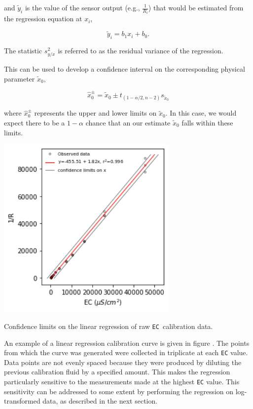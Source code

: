 and $\tilde{y}_i$ is the value of the sensor output (e.g., $\frac{1}{R_i}$) that would be estimated from the regression equation at $x_i$,

\begin{equation}\label{eq:linear}
	\tilde{y}_i=b_1 x_i +b_0.  
\end{equation}

The statistic $s_{y/x}^2$ is referred to as the residual variance of the regression. 

This can be used to develop a confidence interval on the corresponding physical parameter $\tilde{x}_0$, 

\begin{equation}\label{eq:confidence}
	\hat{x}_0^\pm = \tilde{x}_0 \pm t_{({1-\alpha/2,n-2})}s_{\tilde{x}_0}
\end{equation}

where $\hat{x}_0^\pm$ represents the upper and lower limits on $\tilde{x}_0$.  In this case, we would expect there to be a $1-\alpha$ chance that an our estimate $\tilde{x}_0$ falls within these limits.

\begin{marginfigure}[0cm]
	\begin{center}
		\includegraphics[height=9cm]{Images/linear_confidence.png}
		\caption[Confidence Limits on Linear Regression]{Confidence limits on the linear regression of raw \texttt{EC }calibration data.}
	\end{center}
\end{marginfigure}

An example of a linear regression calibration curve is given in figure . The points from which the curve was generated were collected in triplicate at each \texttt{EC} value.  Data points are not evenly spaced because they were produced by diluting the previous calibration fluid by a specified amount.  This makes the regression particularly sensitive to the measurements made at the highest \texttt{EC} value. This sensitivity can be addressed to some extent by performing the regression on log-transformed data, as described in the next section.

